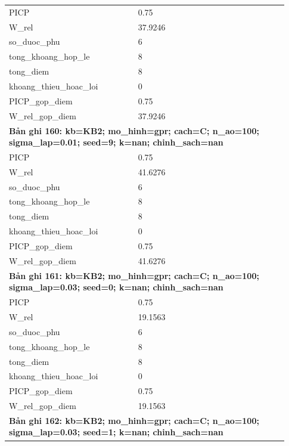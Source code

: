 \begin{longtable}{p{0.43\linewidth}p{0.50\linewidth}}
PICP & 0.75 \\
W\_\allowbreak rel & 37.9246 \\
so\_\allowbreak duoc\_\allowbreak phu & 6 \\
tong\_\allowbreak khoang\_\allowbreak hop\_\allowbreak le & 8 \\
tong\_\allowbreak diem & 8 \\
khoang\_\allowbreak thieu\_\allowbreak hoac\_\allowbreak loi & 0 \\
PICP\_\allowbreak gop\_\allowbreak diem & 0.75 \\
W\_\allowbreak rel\_\allowbreak gop\_\allowbreak diem & 37.9246 \\
\midrule
\multicolumn{2}{p{0.95\linewidth}}{\textbf{Bản ghi 160: kb=KB2; mo\_hinh=gpr; cach=C; n\_ao=100; sigma\_lap=0.01; seed=9; k=nan; chinh\_sach=nan}} \\
PICP & 0.75 \\
W\_\allowbreak rel & 41.6276 \\
so\_\allowbreak duoc\_\allowbreak phu & 6 \\
tong\_\allowbreak khoang\_\allowbreak hop\_\allowbreak le & 8 \\
tong\_\allowbreak diem & 8 \\
khoang\_\allowbreak thieu\_\allowbreak hoac\_\allowbreak loi & 0 \\
PICP\_\allowbreak gop\_\allowbreak diem & 0.75 \\
W\_\allowbreak rel\_\allowbreak gop\_\allowbreak diem & 41.6276 \\
\midrule
\multicolumn{2}{p{0.95\linewidth}}{\textbf{Bản ghi 161: kb=KB2; mo\_hinh=gpr; cach=C; n\_ao=100; sigma\_lap=0.03; seed=0; k=nan; chinh\_sach=nan}} \\
PICP & 0.75 \\
W\_\allowbreak rel & 19.1563 \\
so\_\allowbreak duoc\_\allowbreak phu & 6 \\
tong\_\allowbreak khoang\_\allowbreak hop\_\allowbreak le & 8 \\
tong\_\allowbreak diem & 8 \\
khoang\_\allowbreak thieu\_\allowbreak hoac\_\allowbreak loi & 0 \\
PICP\_\allowbreak gop\_\allowbreak diem & 0.75 \\
W\_\allowbreak rel\_\allowbreak gop\_\allowbreak diem & 19.1563 \\
\midrule
\multicolumn{2}{p{0.95\linewidth}}{\textbf{Bản ghi 162: kb=KB2; mo\_hinh=gpr; cach=C; n\_ao=100; sigma\_lap=0.03; seed=1; k=nan; chinh\_sach=nan}} \\

\end{longtable}
